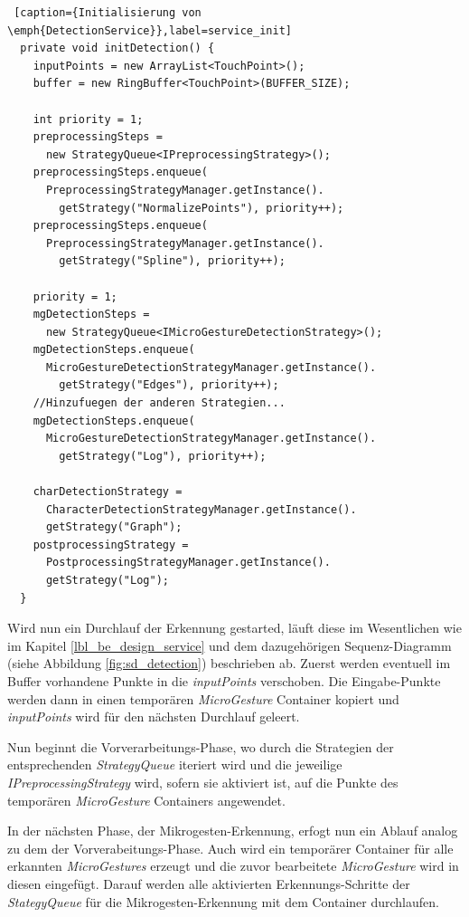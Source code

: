 \begin{lstlisting} [caption={Initialisierung von \emph{DetectionService}},label=service_init]
  private void initDetection() {
    inputPoints = new ArrayList<TouchPoint>();
    buffer = new RingBuffer<TouchPoint>(BUFFER_SIZE);
    
    int priority = 1;
    preprocessingSteps = 
      new StrategyQueue<IPreprocessingStrategy>();
    preprocessingSteps.enqueue(
      PreprocessingStrategyManager.getInstance().
        getStrategy("NormalizePoints"), priority++);
    preprocessingSteps.enqueue(
      PreprocessingStrategyManager.getInstance().
        getStrategy("Spline"), priority++);	

    priority = 1;
    mgDetectionSteps = 
      new StrategyQueue<IMicroGestureDetectionStrategy>();
    mgDetectionSteps.enqueue(
      MicroGestureDetectionStrategyManager.getInstance().
        getStrategy("Edges"), priority++);
    //Hinzufuegen der anderen Strategien...
    mgDetectionSteps.enqueue(
      MicroGestureDetectionStrategyManager.getInstance().
        getStrategy("Log"), priority++);

    charDetectionStrategy = 
      CharacterDetectionStrategyManager.getInstance().
      getStrategy("Graph");
    postprocessingStrategy = 
      PostprocessingStrategyManager.getInstance().
      getStrategy("Log");
  }
\end{lstlisting}

Wird nun ein Durchlauf der Erkennung gestarted, läuft diese im Wesentlichen wie im Kapitel \ref{lbl_be_design_service} und dem dazugehörigen Sequenz-Diagramm (siehe Abbildung \ref{fig:sd_detection}) beschrieben ab. Zuerst werden eventuell im Buffer vorhandene Punkte in die \emph{inputPoints} verschoben. Die Eingabe-Punkte werden dann in einen temporären \emph{MicroGesture} Container kopiert und \emph{inputPoints} wird für den nächsten Durchlauf geleert.

Nun beginnt die Vorverarbeitungs-Phase, wo durch die Strategien der entsprechenden \emph{StrategyQueue} iteriert wird und die jeweilige \emph{IPreprocessingStrategy} wird, sofern sie aktiviert ist, auf die Punkte des temporären \emph{MicroGesture} Containers angewendet.

In der nächsten Phase, der Mikrogesten-Erkennung, erfogt nun ein Ablauf analog zu dem der Vorverabeitungs-Phase. Auch wird ein temporärer Container für alle erkannten \emph{MicroGestures} erzeugt und die zuvor bearbeitete \emph{MicroGesture} wird in diesen eingefügt. Darauf werden alle aktivierten Erkennungs-Schritte der \emph{StategyQueue} für die Mikrogesten-Erkennung mit dem Container durchlaufen.

